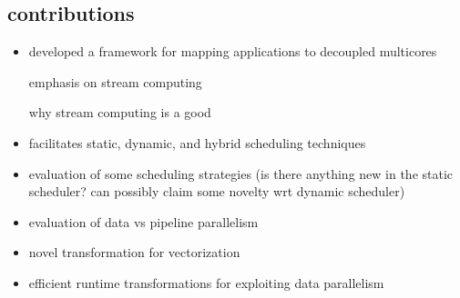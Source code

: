 

\subsection{contributions}

\begin{itemize}

\item developed a framework for mapping applications to decoupled multicores

emphasis on stream computing

why stream computing is a good 

\item facilitates static, dynamic, and hybrid scheduling techniques

\item evaluation of some scheduling strategies (is there anything new in the
static scheduler? can possibly claim some novelty wrt dynamic scheduler)

\item evaluation of data vs pipeline parallelism

\item novel transformation for vectorization

\item efficient runtime transformations for exploiting data parallelism

\end{itemize}





